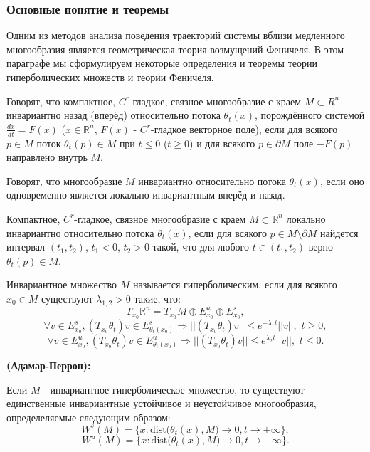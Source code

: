 \subsubsection{Основные понятие и теоремы}

Одним из методов анализа поведения траекторий системы вблизи медленного многообразия является  геометрическая теория возмущений Феничеля. 
В этом параграфе мы сформулируем некоторые определения и теоремы теории гиперболических множеств и теории Феничеля.

\begin{dfn}
Говорят, что компактное, $C^r$-гладкое, связное многообразие с краем $M \subset R^n$ инвариантно назад (вперёд) относительно потока $\theta_t (x)$, порождённого системой $\frac{dx}{dt} = F(x)$ ($x \in \mathbb{R}^n$, $F(x)$ - $C^r$-гладкое векторное поле), если для всякого $p \in M$ поток $\theta_t (p) \in M$ при $t \leq 0$ 
($t \geq 0$) и для всякого $p \in \partial M$ поле $-F(p)$  направлено внутрь $M$. 

Говорят, что многообразие $M$ инвариантно относительно потока $\theta_t (x)$, если оно одновременно является локально инвариантным вперёд и назад.
\end{dfn}

\begin{dfn}
Компактное, $C^r$-гладкое, связное многообразие с краем $M \subset \mathbb{R}^n$ локально инвариантно относительно потока $\theta_t (x)$, если для всякого $p \in M \setminus \partial M$ найдется интервал $(t_1,t_2)$, $t_1<0$, $t_2>0$ такой, что для любого $t \in (t_1,t_2)$ верно $\theta_t(p) \in M$.
\end{dfn}

\begin{dfn}
Инвариантное множество $M$ называется гиперболическим, если для всякого 
$x_0 \in M$ существуют $\lambda_{1,2} > 0$ такие, что:
$$T_{x_0}\mathbb{R}^{n} = T_{x_0} M \oplus E_{x_0}^u \oplus E_{x_0}^s ,$$
$$\forall v \in E_{x_0}^s, (T_{x_0} \theta_t)v \in E_{\theta_t(x_0)}^s \Rightarrow ||(T_{x_0} \theta_t)v|| \leq e^{-\lambda_1 t} ||v||,\,\, t \geq 0 ,$$
$$\forall v \in E_{x_0}^u, (T_{x_0} \theta_t)v \in E_{\theta_t(x_0)}^u \Rightarrow ||(T_{x_0} \theta_t)v|| \leq e^{\lambda_2 t} ||v||,\,\, t \leq 0 .$$
\end{dfn}

\begin{thm}
\textbf{(Адамар-Перрон):}

Если $M$ - инвариантное гиперболическое множество, то существуют единственные инвариантные устойчивое и неустойчивое многообразия, определеляемые следующим образом:
$$W^s(M) = \{ x: \text{dist} \big(\theta_t(x), M \big) \rightarrow 0, t \rightarrow +\infty \},$$
$$W^u(M) = \{ x: \text{dist} \big(\theta_t(x), M \big) \rightarrow 0, t \rightarrow -\infty \}.$$
\end{thm}

